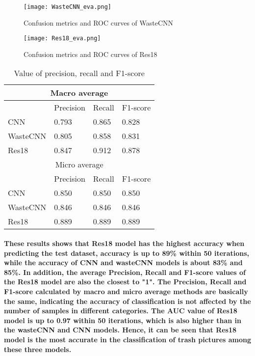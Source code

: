 \documentclass{article}
\begin{document}
\begin{figure}
    \begin{centering}
    \texttt{[image: WasteCNN\_eva.png]}
    \par\end{centering}
    \caption{Confusion metrics and ROC curves of WasteCNN}
    \label{fig:WasteCNN_confusion_ROC}
\end{figure}

\begin{figure}
    \begin{centering}
    \texttt{[image: Res18\_eva.png]}
    \par\end{centering}
    \caption{Confusion metrics and ROC curves of Res18}
    \label{fig:Res18_confusion_ROC}
\end{figure}

\begin{table}[]
    \centering
    \begin{tabular}{ |p{2cm}||p{2cm}|p{2cm}|p{2cm}|  }
        \hline
            \multicolumn{4}{|c|}{Macro average} \\
        \hline
             & Precision &Recall&F1-score\\
        \hline
            CNN    &   0.793   &   0.865  &    0.828\\
            WasteCNN    &   0.805   &   0.858   &   0.831\\
            Res18   &   0.847   &   0.912   &   0.878\\
        \hline\hline
            \multicolumn{4}{|c|}{Micro average} \\
        \hline
             & Precision &Recall&F1-score\\
        \hline
            CNN    &   0.850   &   0.850  &    0.850\\
            WasteCNN    &   0.846   &   0.846   &   0.846\\
            Res18   &   0.889   &   0.889   &   0.889\\
        \hline
    \end{tabular}
    \caption{Value of precision, recall and F1-score}
    \label{tab:my_label}
\end{table}

\paragraph{These results shows that Res18 model has the highest accuracy when predicting the test dataset, accuracy is up to 89\% within 50 iterations, while the accuracy of CNN and wasteCNN models is about 83\% and 85\%. In addition, the average Precision, Recall and F1-score values of the Res18 model are also the closest to "1". The Precision, Recall and F1-score calculated by macro and micro average methods are basically the same, indicating the accuracy of classification is not affected by the number of samples in different categories. The AUC value of Res18 model is up to 0.97 within 50 iterations, which is also higher than in the wasteCNN and CNN models. Hence, it can be seen that Res18 model is the most accurate in the classification of trash pictures among these three models.}
\end{document}
